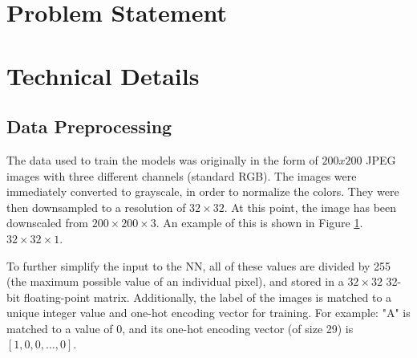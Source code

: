 \documentclass[10pt,Times New Roman]{article}
\begin{document}
\section{Problem Statement}

\section{Technical Details}
    \subsection{Data Preprocessing}
    The data used to train the models was originally in the form of $200x200$ JPEG images with 
    three different channels (standard RGB). The images were immediately converted to grayscale, 
    in order to normalize the colors. They were then downsampled to a resolution of $32 \times 32$. At 
    this point, the image has been downscaled from $200 \times 200 \times 3$. An example of this is
    shown in Figure \ref{fig:a_images}.
$32 \times 32 \times 1$. 
\begin{figure}[h]
    \caption{}
    \label{fig:a_images}
\end{figure}
    
    To further simplify the input to the NN, all of these values are divided
    by 255 (the maximum possible value of an individual pixel), and stored in a $32 \times 32$ 
    32-bit floating-point matrix. Additionally, the label of the images is matched to a unique 
    integer value and one-hot encoding vector for training. For example: "A" is matched to a value
    of 0, and its one-hot encoding vector (of size 29) is $[1,0,0,\ldots,0]$.
\end{document}

